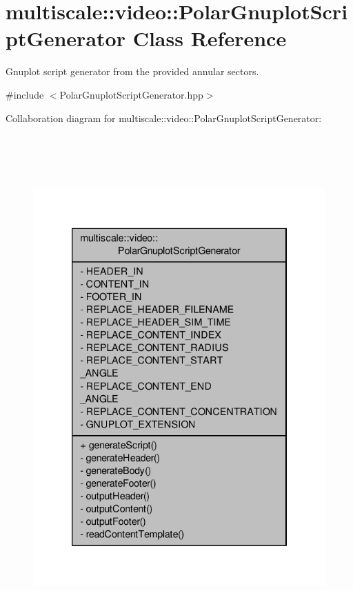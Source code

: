 \hypertarget{classmultiscale_1_1video_1_1PolarGnuplotScriptGenerator}{\section{multiscale\-:\-:video\-:\-:Polar\-Gnuplot\-Script\-Generator Class Reference}
\label{classmultiscale_1_1video_1_1PolarGnuplotScriptGenerator}
}


Gnuplot script generator from the provided annular sectors.  




{\ttfamily \#include $<$Polar\-Gnuplot\-Script\-Generator.\-hpp$>$}



Collaboration diagram for multiscale\-:\-:video\-:\-:Polar\-Gnuplot\-Script\-Generator\-:\nopagebreak
\begin{figure}[H]
\begin{center}
\leavevmode
\includegraphics[height=550pt]{classmultiscale_1_1video_1_1PolarGnuplotScriptGenerator__coll__graph}
\end{center}
\end{figure}
